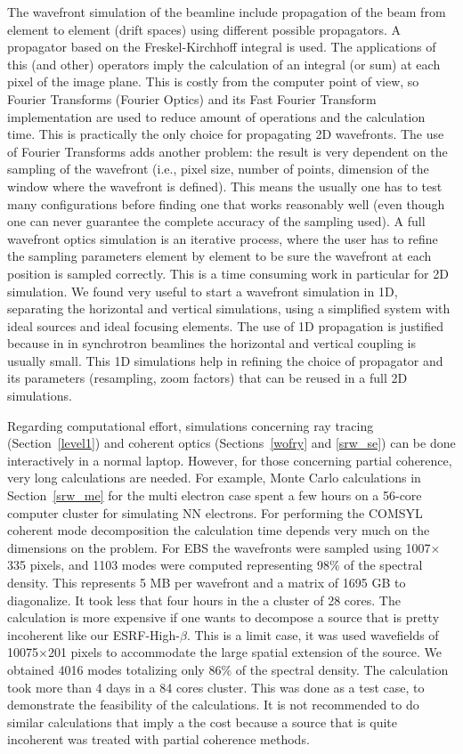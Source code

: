 \documentclass{iucr}              %
\newcommand{\inred}[1]{{\color{red}#1}}
\begin{document}
The wavefront simulation of the beamline include propagation of the beam from element to element (drift spaces) using different possible propagators. A propagator based on the Freskel-Kirchhoff integral is used. The applications of this (and other) operators imply the calculation of an integral (or sum) at each pixel of the image plane. This is costly from the computer point of view, so Fourier Transforms (Fourier Optics) and its Fast Fourier Transform implementation are used to reduce amount of operations and the calculation time. This is practically the only choice for propagating 2D wavefronts. The use of Fourier Transforms adds another problem: the result is very dependent on the sampling of the wavefront (i.e., pixel size, number of points, dimension of the window where the wavefront is defined). This means the usually one has to test many configurations before finding one that works reasonably well (even though one can never guarantee the complete accuracy of the sampling used). A full wavefront optics simulation is an iterative process, where the user has to refine the sampling parameters element by element to be sure the wavefront at each position is sampled correctly. This is a time consuming work in particular for 2D simulation. We found very useful to start a wavefront simulation in 1D, separating the horizontal and vertical simulations, using a simplified system with ideal sources and ideal focusing elements. The use of 1D propagation is justified because in in synchrotron beamlines the horizontal and vertical coupling is usually small. This 1D simulations help in refining the choice of propagator and its parameters (resampling, zoom factors) that can be reused in a full 2D simulations.

Regarding computational effort, simulations concerning ray tracing (Section~\ref{level1}) and coherent optics (Sections~\ref{wofry} and \ref{srw_se}) can be done interactively in a normal laptop. However, for those concerning partial coherence, very long calculations are needed. For example, Monte Carlo calculations in Section~\ref{srw_me} for the multi electron case spent a few hours on a 56-core computer cluster for simulating \inred{NN} electrons. For performing the COMSYL coherent mode decomposition the calculation time depends very much on the dimensions on the problem. For EBS the wavefronts were sampled using 1007$\times$335 pixels, and 1103 modes were computed representing 98\% of the spectral density. This represents 5 MB per wavefront and a matrix of 1695 GB to diagonalize. It took less that four hours in the a cluster of 28 cores. The calculation is more expensive if one wants to decompose a source that is pretty incoherent like our ESRF-High-$\beta$. This is a limit case, it was used wavefields of 10075$\times$201 pixels to accommodate the large spatial extension of the source. We obtained 4016 modes totalizing only 86\% of the spectral density.  The calculation took more than 4 days in a 84 cores cluster. This was done as a test case, to demonstrate the feasibility of the calculations. It is not recommended to do similar calculations that imply a the cost because a source that is quite incoherent was treated with partial coherence methods. 
\end{document}
